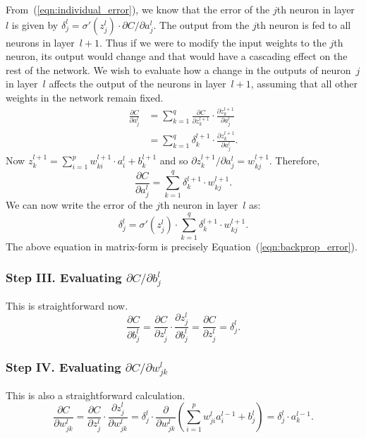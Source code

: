 From~(\ref{eqn:individual_error}), we know that the error of the $j$th neuron in
layer~$l$ is given by
$\delta_j^l = \sigma' (z_j^l) \cdot \partial C / \partial a_j^l$. The output from
the $j$th neuron is fed to all neurons in layer~$l + 1$. Thus if we were to modify
the input weights to the $j$th neuron, its output would change and that would have a
cascading effect on the rest of the network. We wish to evaluate
how a change in the outputs of neuron~$j$ in layer~$l$ affects the output of
the neurons in layer~$l + 1$, assuming that all other weights in the network remain
fixed.
\begin{align}
\frac{\partial C}{\partial a_j^l}
    & = \sum_{k = 1}^q \frac{\partial C}{\partial z_k^{l + 1}} \cdot \frac{\partial z_k^{l + 1}}{\partial a_j^l} \nonumber \\
    & = \sum_{k = 1}^q \delta_k^{l + 1} \cdot  \frac{\partial z_k^{l + 1}}{\partial a_j^l}.
\end{align}
Now $z_k^{l + 1} = \sum_{i = 1}^p w_{k i}^{l + 1} \cdot a_i^l + b_k^{l + 1}$ and so
$\partial z_k^{l + 1} / \partial a_j^l = w_{k j}^{l + 1}$. Therefore,
\begin{equation}
    \frac{\partial C}{\partial a_j^l} = \sum_{k = 1}^q \delta_{k}^{l + 1} \cdot w_{k j}^{l + 1}.
\end{equation}
We can now write the error of the $j$th neuron in layer~$l$ as:
\begin{equation}
    \delta_j^l =  \sigma' (z_j^l) \cdot \sum_{k = 1}^q \delta_{k}^{l + 1} \cdot w_{k j}^{l + 1}.
\end{equation}
The above equation in matrix-form is precisely Equation~(\ref{eqn:backprop_error}).

\subsubsection{Step III. Evaluating $\partial C / \partial b_j^l$}
This is straightforward now.
\begin{equation}
    \frac{\partial C}{\partial b_j^l} =
    \frac{\partial C}{\partial z_j^l} \cdot \frac{\partial z_j^l}{\partial b_j^l} =
    \frac{\partial C}{\partial z_j^l} = \delta_j^l.
\end{equation}

\subsubsection{Step IV. Evaluating $\partial C / \partial w_{j k}^l$}
This is also a straightforward calculation.
\begin{equation}
    \frac{\partial C}{\partial w_{j k}^l} =
    \frac{\partial C}{\partial z_j^l} \cdot \frac{\partial z_j^l}{\partial w_{j k}^l} =
    \delta_j^l \cdot \frac{\partial}{\partial w_{j k}^l} \left (\sum_{i = 1}^p w_{j i}^l a_i^{l - 1} + b_j^l \right ) =
    \delta_j^l \cdot a_k^{l - 1}.
\end{equation}

